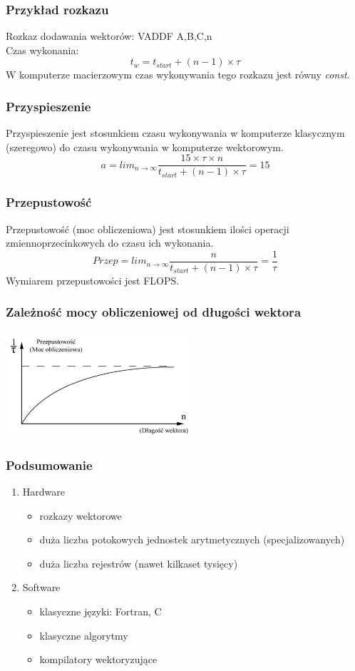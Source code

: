 \documentclass[a4paper,twoside]{article}
\begin{document}
\subsubsection{Przykład rozkazu}
Rozkaz dodawania wektorów: VADDF A,B,C,n\\
Czas wykonania:
$$t_{w}=t_{start}+(n-1)\times\tau$$
W komputerze macierzowym czas wykonywania tego rozkazu jest równy \emph{const}.

\subsubsection{Przyspieszenie}
Przyspieszenie jest stosunkiem czasu wykonywania w komputerze klasycznym (szeregowo) do czasu wykonywania w komputerze wektorowym.
$$a=lim_{n \to \infty}\frac{15\times\tau\times n}{t_{start}+(n-1)\times\tau}=15$$

\subsubsection{Przepustowość}
Przepustowość (moc obliczeniowa) jest stosunkiem ilości operacji zmiennoprzecinkowych do czasu ich wykonania.
$$Przep=lim_{n \to \infty}\frac{n}{t_{start}+(n-1)\times\tau}=\frac{1}{\tau}$$
Wymiarem przepustowości jest FLOPS.

\subsubsection{Zależność mocy obliczeniowej od długości wektora}
\begin{center}
	\includegraphics[width=0.52\textwidth]{./images/simd01}
\end{center}

\subsubsection{Podsumowanie}
\begin{enumerate}
	\item Hardware
	\begin{itemize}
		\item rozkazy wektorowe
		\item duża liczba potokowych jednostek arytmetycznych (specjalizowanych)
		\item duża liczba rejestrów (nawet kilkaset tysięcy)
	\end{itemize}
	\item Software
	\begin{itemize}
		\item klasyczne języki: Fortran, C
		\item klasyczne algorytmy
		\item kompilatory wektoryzujące
	\end{itemize}
\end{enumerate}
\end{document}
